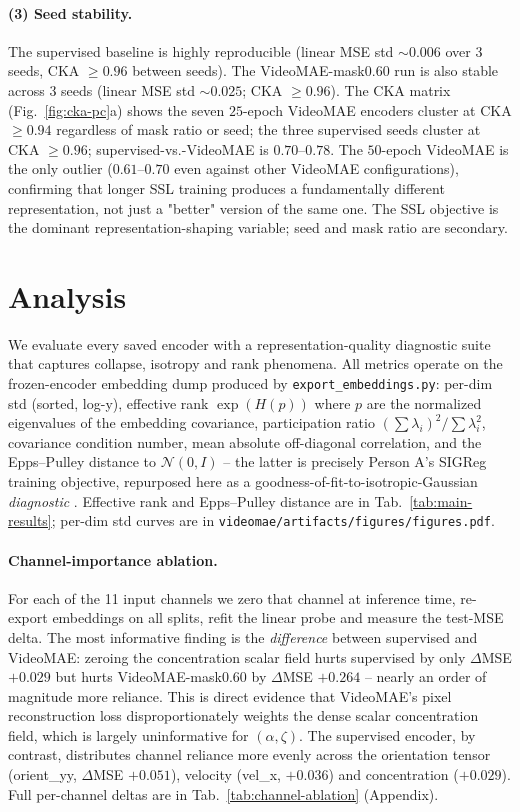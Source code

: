 \documentclass{article}
\begin{document}
\paragraph{(3) Seed stability.} The supervised baseline is highly reproducible
(linear MSE std $\sim$$0.006$ over 3 seeds, CKA $\geq 0.96$ between seeds).
The VideoMAE-mask$0.60$ run is also stable across 3 seeds (linear MSE std
$\sim$$0.025$; CKA $\geq 0.96$). The CKA matrix
(Fig.~\ref{fig:cka-pc}a) shows the seven $25$-epoch VideoMAE encoders cluster at
CKA $\geq 0.94$ regardless of mask ratio or seed; the three supervised seeds
cluster at CKA $\geq 0.96$; supervised-vs.-VideoMAE is $0.70$--$0.78$. The
$50$-epoch VideoMAE is the only outlier ($0.61$--$0.70$ even against other
VideoMAE configurations), confirming that longer SSL training produces a
fundamentally different representation, not just a "better" version of the
same one. The SSL objective is the dominant representation-shaping variable;
seed and mask ratio are secondary.


\section{Analysis}
\label{sec:analysis}

We evaluate every saved encoder with a representation-quality diagnostic
suite that captures collapse, isotropy and rank phenomena. All metrics
operate on the frozen-encoder embedding dump produced by
\texttt{export\_embeddings.py}: per-dim std (sorted, log-y), effective rank
$\exp(H(p))$ where $p$ are the normalized eigenvalues of the embedding
covariance, participation ratio $(\sum \lambda_i)^2 / \sum \lambda_i^2$,
covariance condition number, mean absolute off-diagonal correlation, and the
Epps--Pulley distance to $\mathcal{N}(0,I)$ -- the latter is precisely Person
A's SIGReg training objective, repurposed here as a
goodness-of-fit-to-isotropic-Gaussian \emph{diagnostic}
\citep{balestriero2026lejepa}. Effective rank and Epps--Pulley distance are in
Tab.~\ref{tab:main-results}; per-dim std curves are in
\texttt{videomae/artifacts/figures/figures.pdf}.

\paragraph{Channel-importance ablation.} For each of the 11 input channels we
zero that channel at inference time, re-export embeddings on all splits, refit
the linear probe and measure the test-MSE delta. The most informative finding
is the \emph{difference} between supervised and VideoMAE: zeroing the
concentration scalar field hurts supervised by only $\Delta$MSE $+0.029$ but
hurts VideoMAE-mask$0.60$ by $\Delta$MSE $+0.264$ -- nearly an order of
magnitude more reliance. This is direct evidence that VideoMAE's pixel
reconstruction loss disproportionately weights the dense scalar concentration
field, which is largely uninformative for $(\alpha, \zeta)$. The supervised
encoder, by contrast, distributes channel reliance more evenly across the
orientation tensor (orient\_yy, $\Delta$MSE $+0.051$), velocity (vel\_x,
$+0.036$) and concentration ($+0.029$). Full per-channel deltas are in
Tab.~\ref{tab:channel-ablation} (Appendix).
\end{document}
